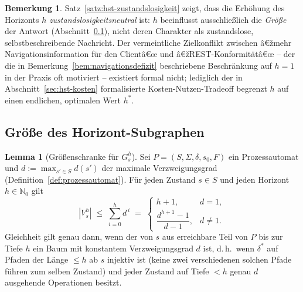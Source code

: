 ﻿\documentclass[a4paper,12pt]{article}
\theoremstyle{definition}
\newtheorem{lemma}{Lemma}
\newtheorem{bemerkung}{Bemerkung}
\begin{document}
\begin{bemerkung}
	\label{bem:zustandslosigkeit-frei}
	Satz~\ref{satz:hst-zustandslosigkeit} zeigt, dass die Erhöhung des Horizonts $h$
	\emph{zustandslosigkeitsneutral} ist: $h$ beeinflusst ausschließlich die
	\emph{Größe} der Antwort (Abschnitt~\ref{sec:hst-groesse}), nicht deren Charakter als
	zustandslose, selbstbeschreibende Nachricht. Der vermeintliche Zielkonflikt zwischen
	â€žmehr Navigationsinformation für den Clientâ€œ und â€žREST-Konformitätâ€œ -- der die in
	Bemerkung~\ref{bem:navigationsdefizit} beschriebene Beschränkung auf $h=1$ in der
	Praxis oft motiviert -- existiert formal nicht; lediglich der in
	Abschnitt~\ref{sec:hst-kosten} formalisierte Kosten-Nutzen-Tradeoff begrenzt $h$ auf
	einen endlichen, optimalen Wert $h^\ast$.
\end{bemerkung}
\subsection{Größe des Horizont-Subgraphen}
\label{sec:hst-groesse}

\begin{lemma}[Größenschranke für $G_s^h$]
	\label{lem:horizont-groesse}
	Sei $P=(S,\Sigma,\delta,s_0,F)$ ein Prozessautomat und $d:=\max_{s'\in S}d(s')$ der
	maximale Verzweigungsgrad (Definition~\ref{def:prozessautomat}). Für jeden Zustand
	$s\in S$ und jeden Horizont $h\in\mathbb{N}_0$ gilt
	\[
		|V_s^h| \;\le\; \sum_{i=0}^{h} d^{\,i} \;=\;
		\begin{cases}
			h+1, & d=1,\\[2pt]
			\dfrac{d^{h+1}-1}{d-1}, & d\ne1.
		\end{cases}
	\]
	Gleichheit gilt genau dann, wenn der von $s$ aus erreichbare Teil von $P$ bis zur
	Tiefe $h$ ein Baum mit konstantem Verzweigungsgrad $d$ ist, d.\,h.\ wenn
	$\delta^{*}$ auf Pfaden der Länge $\le h$ ab $s$ injektiv ist (keine zwei
	verschiedenen solchen Pfade führen zum selben Zustand) und jeder Zustand auf Tiefe
	$<h$ genau $d$ ausgehende Operationen besitzt.
\end{lemma}
\end{document}

